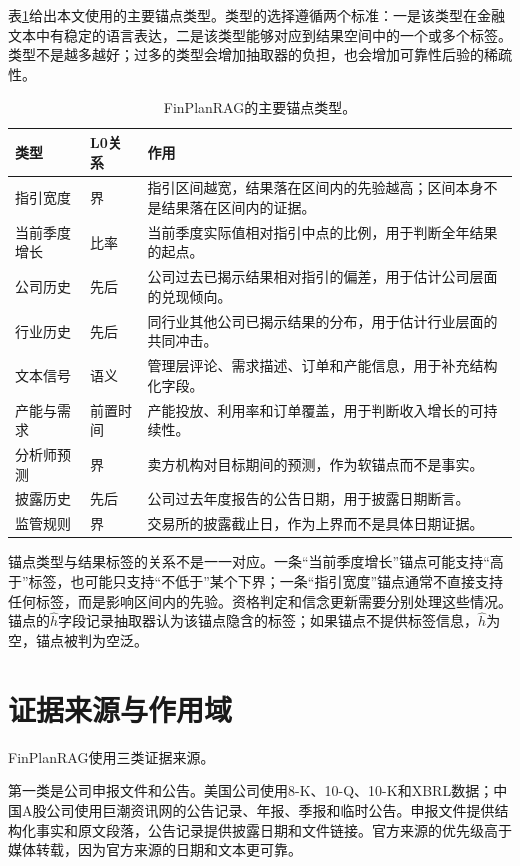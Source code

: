 表\ref{tab:anchortypes}给出本文使用的主要锚点类型。类型的选择遵循两个标准：一是该类型在金融文本中有稳定的语言表达，二是该类型能够对应到结果空间中的一个或多个标签。类型不是越多越好；过多的类型会增加抽取器的负担，也会增加可靠性后验的稀疏性。

\begin{table}[H]
\centering
{}
\caption{FinPlanRAG的主要锚点类型。}
\label{tab:anchortypes}
\begin{tabular}{p{2.6cm}p{2.4cm}p{7.2cm}}
\toprule
类型 & L0关系 & 作用 \\
\midrule
指引宽度 & 界 & 指引区间越宽，结果落在区间内的先验越高；区间本身不是结果落在区间内的证据。\\
当前季度增长 & 比率 & 当前季度实际值相对指引中点的比例，用于判断全年结果的起点。\\
公司历史 & 先后 & 公司过去已揭示结果相对指引的偏差，用于估计公司层面的兑现倾向。\\
行业历史 & 先后 & 同行业其他公司已揭示结果的分布，用于估计行业层面的共同冲击。\\
文本信号 & 语义 & 管理层评论、需求描述、订单和产能信息，用于补充结构化字段。\\
产能与需求 & 前置时间 & 产能投放、利用率和订单覆盖，用于判断收入增长的可持续性。\\
分析师预测 & 界 & 卖方机构对目标期间的预测，作为软锚点而不是事实。\\
披露历史 & 先后 & 公司过去年度报告的公告日期，用于披露日期断言。\\
监管规则 & 界 & 交易所的披露截止日，作为上界而不是具体日期证据。\\
\bottomrule
\end{tabular}
\end{table}

锚点类型与结果标签的关系不是一一对应。一条“当前季度增长”锚点可能支持“高于”标签，也可能只支持“不低于”某个下界；一条“指引宽度”锚点通常不直接支持任何标签，而是影响区间内的先验。资格判定和信念更新需要分别处理这些情况。锚点的$\hat h$字段记录抽取器认为该锚点隐含的标签；如果锚点不提供标签信息，$\hat h$为空，锚点被判为空泛。

\section{证据来源与作用域}

FinPlanRAG使用三类证据来源。

第一类是公司申报文件和公告。美国公司使用8-K、10-Q、10-K和XBRL数据；中国A股公司使用巨潮资讯网的公告记录、年报、季报和临时公告。申报文件提供结构化事实和原文段落，公告记录提供披露日期和文件链接。官方来源的优先级高于媒体转载，因为官方来源的日期和文本更可靠。

